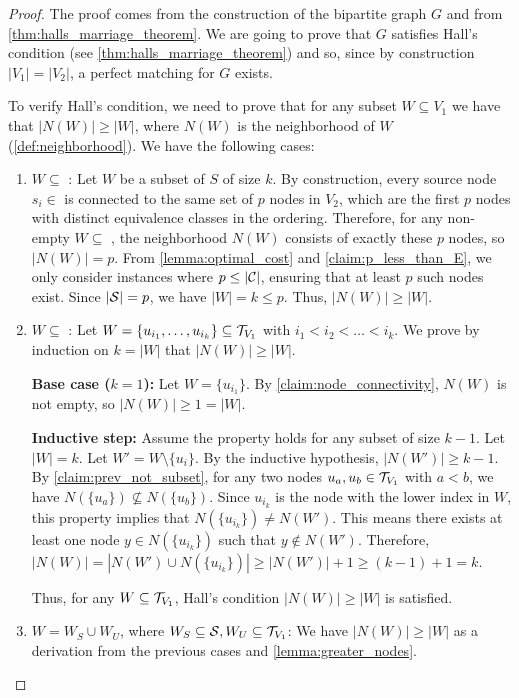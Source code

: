 \begin{proof}
    The proof comes from the construction of the bipartite graph $G$ and from \cref{thm:halls_marriage_theorem}. We are going to prove that $G$ satisfies Hall's condition (see \cref{thm:halls_marriage_theorem}) and so, since by construction $|V_1| = |V_2|$, a perfect matching for $G$ exists.

    To verify Hall's condition, we need to prove that for any subset $W \subseteq V_1$ we have that $|N(W)| \geq |W|$, where $N(W)$ is the neighborhood of $W$ (\cref{def:neighborhood}). We have the following cases:
    \begin{enumerate}
        \item $W \subseteq$ \sourceset: Let $W$ be a subset of $S$ of size $k$. By construction, every source node $s_i \in$ \sourceset is connected to the same set of $p$ nodes in $V_2$, which are the first $p$ nodes with distinct equivalence classes in the ordering. Therefore, for any non-empty $W \subseteq$ \sourceset, the neighborhood $N(W)$ consists of exactly these $p$ nodes, so $|N(W)| = p$. From \cref{lemma:optimal_cost} and \cref{claim:p_less_than_E}, we only consider instances where $p \leq |\mathcal{C}|$, ensuring that at least $p$ such nodes exist. Since $|\mathcal{S}|=p$, we have $|W| = k \leq p$. Thus, $|N(W)| \geq |W|$.
        
        \item $W \subseteq$ : Let $W = \{u_{i_1}, \dots, u_{i_k}\} \subseteq \mathcal{T}_{V_1}$ with $i_1 < i_2 < \dots < i_k$. We prove by induction on $k = |W|$ that $|N(W)| \geq |W|$.
        
        \textbf{Base case ($k=1$):} Let $W = \{u_{i_1}\}$. By \cref{claim:node_connectivity}, $N(W)$ is not empty, so $|N(W)| \geq 1 = |W|$.
        
        \textbf{Inductive step:} Assume the property holds for any subset of size $k-1$. Let $|W|=k$. Let $W' = W \setminus \{u_{i}\}$. By the inductive hypothesis, $|N(W')| \geq k-1$. By \cref{claim:prev_not_subset}, for any two nodes $u_a, u_b \in \mathcal{T}_{V_1}$ with $a < b$, we have $N(\{u_a\}) \not\subseteq N(\{u_b\})$. Since $u_{i_k}$ is the node with the lower index in $W$, this property implies that $N(\{u_{i_k}\}) \neq N(W')$. This means there exists at least one node $y \in N(\{u_{i_k}\})$ such that $y \notin N(W')$. Therefore, $|N(W)| = |N(W') \cup N(\{u_{i_k}\})| \geq |N(W')| + 1 \geq (k-1) + 1 = k$.

        Thus, for any $W \subseteq \mathcal{T}_{V_1}$, Hall's condition $|N(W)| \geq |W|$ is satisfied.
        
        \item $W=W_S \cup W_U$, where $W_S \subseteq \mathcal{S}, W_U \subseteq \mathcal{T}_{V_1}$: We have $|N(W)| \geq |W|$ as a derivation from the previous cases and \cref{lemma:greater_nodes}.
    \end{enumerate}
\end{proof}

